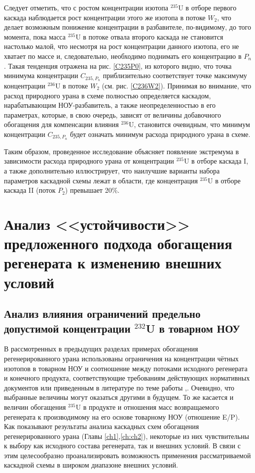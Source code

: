 {Следует отметить, что с ростом концентрации изотопа $^{235}$U в отборе первого каскада наблюдается рост концентрации этого же изотопа в потоке $W_2$, что делает возможным понижение концентрации в разбавителе, по-видимому, до того момента, пока масса $^{235}$U в потоке отвала второго каскада не становится настолько малой, что несмотря на рост концентрации данного изотопа, его не хватает по массе и, следовательно, необходимо поднимать его концентрацию в $P_n$. Такая тенденция отражена на рис. \ref{C235P0}, из которого видно, что точка минимума концентрации $C_{235,{P_n}}$ приблизительно соответствует точке максимуму концентрации $^{236}$U в потоке $W_2$ (см. рис. \ref{C236W2}). Принимая во внимание, что расход природного урана в схеме полностью определяется каскадом, нарабатывающим НОУ-разбавитель, а также неопределенностью в его параметрах, которые, в свою очередь, зависят от величины добавочного обогащения для компенсации влияния $^{236}$U, становится очевидным, что минимум концентрации $C_{235,{P_n}}$ будет означать минимум расхода природного урана в схеме. 

Таким образом, проведенное исследование объясняет появление экстремума в зависимости расхода природного урана от концентрации $^{235}$U в отборе каскада I, а также дополнительно иллюстрирует, что наилучшие варианты набора параметров каскадной схемы лежат в области, где концентрация $^{235}$U в отборе каскада II (поток $P_2$) превышает 20\%. 

\section{Анализ <<устойчивости>> предложенного подхода обогащения регенерата к изменению внешних условий}
\subsection{Анализ влияния ограничений предельно допустимой концентрации $^{232}$U в товарном НОУ}

В рассмотренных в предыдущих разделах примерах обогащения регенерированного урана использованы ограничения на концентрации чётных изотопов в товарном НОУ и соотношение между потоками исходного регенерата и конечного продукта, соответствующие требованиям действующих нормативных документов или приведенным в литературе по теме работы \cite{smirnovEvolutionIsotopicComposition2012},\cite{smirnovKaskadnyeShemyZadachah2012}. Очевидно, что выбранные величины могут оказаться другими в будущем. То же касается и величин обогащения $^{235}$U в продукте и отношения масс возвращаемого регенерата к производимому на его основе товарному НОУ (отношение E/P). Как показывают результаты анализа каскадных схем обогащения регенерированного урана (Главы \ref{ch1},\ref{ch:ch2}), некоторые из них чувствительны к выбору как исходного состава регенерата, так и внешних условий. В связи с этим целесообразно проанализировать возможность применения рассматриваемой каскадной схемы в широком диапазоне внешних условий.

}
